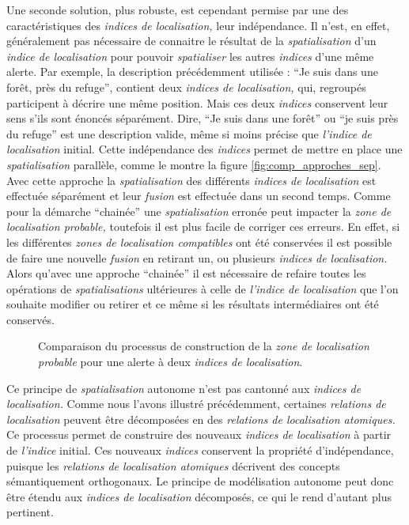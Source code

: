 Une seconde solution, plus robuste, est cependant permise par une des
caractéristiques des \emph{indices de localisation,} leur
indépendance. Il n'est, en effet, généralement pas nécessaire de
connaitre le résultat de la \emph{spatialisation} d'un \emph{indice de
  localisation} pour pouvoir \emph{spatialiser} les autres
\emph{indices} d'une même alerte. Par exemple, la description
précédemment utilisée : \enquote{Je suis dans une forêt, près du
  refuge}, contient deux \emph{indices de localisation,} qui,
regroupés participent à décrire une même position. Mais ces deux
\emph{indices} conservent leur sens s'ils sont énoncés
séparément. Dire, \enquote{Je suis dans une forêt} ou \enquote{je suis
  près du refuge} est une description valide, même si moins précise
que \emph{l'indice de localisation} initial. Cette indépendance des
\emph{indices} permet de mettre en place une \emph{spatialisation}
parallèle, comme le montre la figure
\ref{fig:comp_approches_sep}. Avec cette approche la
\emph{spatialisation} des différents \emph{indices de localisation}
est effectuée séparément et leur \emph{fusion} est effectuée dans un
second temps. Comme pour la démarche \enquote{chainée} une
\emph{spatialisation} erronée peut impacter la \emph{zone de
  localisation probable,} toutefois il est plus facile de corriger ces
erreurs. En effet, si les différentes \emph{zones de localisation
  compatibles} ont été conservées il est possible de faire une
nouvelle \emph{fusion} en retirant un, ou plusieurs \emph{indices de
  localisation.} Alors qu'avec une approche \enquote{chainée} il est
nécessaire de refaire toutes les opérations de \emph{spatialisations}
ultérieures à celle de \emph{l'indice de localisation} que l'on
souhaite modifier ou retirer et ce même si les résultats
intermédiaires ont été conservés.

\begin{figure}
  \centering

  \caption{Comparaison du processus de construction de la \emph{zone
      de localisation probable} pour une alerte à deux \emph{indices
      de localisation}.}
  \label{fig:comp_approches}
\end{figure}

Ce principe de \emph{spatialisation} autonome n'est pas cantonné aux
\emph{indices de localisation.} Comme nous l'avons illustré
précédemment, certaines \emph{relations de localisation} peuvent être
décomposées en des \emph{relations de localisation atomiques.} Ce
processus permet de construire des nouveaux \emph{indices de
  localisation} à partir de \emph{l'indice} initial. Ces nouveaux
\emph{indices} conservent la propriété d'indépendance, puisque les
\emph{relations de localisation atomiques} décrivent des concepts
sémantiquement orthogonaux. Le principe de modélisation autonome peut
donc être étendu aux \emph{indices de localisation} décomposés, ce qui
le rend d'autant plus pertinent.

